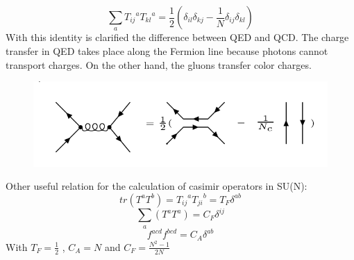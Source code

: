 \begin{equation}
\displaystyle\sum\limits_{a} {T_{ij}}^a {T_{kl}}^a = \frac{1}{2}(\delta_{il}\delta_{kj}-\frac{1}{N}\delta_{ij}\delta_{kl})
\label{Fierz}
\end{equation}
With this identity is clarified the difference between QED and QCD. The charge transfer in QED takes place along the Fermion line because photons cannot transport charges. On the other hand, the gluons transfer color charges. 
\begin{figure}[h!]
\centering
\includegraphics[scale=0.6]{images/Intro/Fritz.png}
\end{figure}
 

Other useful relation for the calculation of casimir operators in SU(N):
\begin{equation}
tr(T^a T^b)= {T_{ij}}^a {T_{ji}}^b = T_F \delta^{ab}
\end{equation}
\begin{equation}
\displaystyle\sum\limits_{a} (T^a T^a) = C_F \delta^{ij}
\end{equation}
\begin{equation}
f^{acd} f^{bcd} = C_A \delta^{ab}
\end{equation}
With $  T_F = \frac{1}{2} $ , $ C_A = N $ and $ C_F = \frac{N^2 -1}{2N} $



\newpage